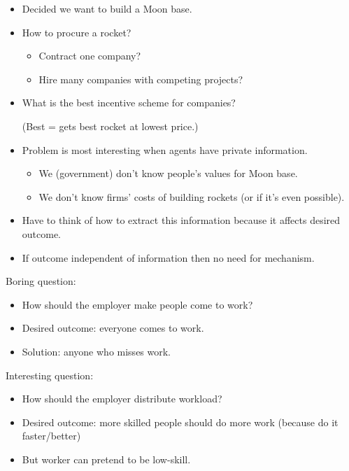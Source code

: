 \documentclass[english]{beamer}		%
\def\lyxframeend{} %
\begin{document}
\begin{itemize}
	\item Decided we want to build a Moon base.
	\item How to procure a rocket?
	\begin{itemize}
		\item Contract one company?
		\item Hire many companies with competing projects?
	\end{itemize}
	\item What is the best incentive scheme for companies? 
	
	(Best = gets best rocket at lowest price.)
\end{itemize}
\lyxframeend


\begin{itemize}
	\item Problem is most interesting when agents have private information.
	\begin{itemize}
		\item We (government) don't know people's values for Moon base.
		\item We don't know firms' costs of building rockets (or if it's even possible).
	\end{itemize}
	\pause
	\item Have to think of how to extract this information because it affects desired outcome.
	
	\item If outcome independent of information then no need for mechanism.
\end{itemize}
\lyxframeend


\begin{exampleblock}{Boring question:}
	\begin{itemize}
		\item How should the employer \alert<1>{make people come to work}?
		\item Desired outcome: everyone comes to work.
		\item Solution:  anyone who misses work.
	\end{itemize}
\end{exampleblock}
\pause
\begin{exampleblock}{Interesting question:}
	\begin{itemize}
		\item How should the employer \alert<2>{distribute workload}?
		\item Desired outcome: more skilled people should do more work (because do it faster/better)
		\item But worker can pretend to be low-skill.
	\end{itemize}
\end{exampleblock}
\lyxframeend
\end{document}
